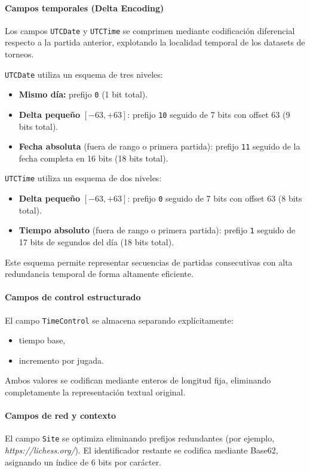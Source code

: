\documentclass[11pt, letterpaper]{article}
\begin{document}
\paragraph{Campos temporales (Delta Encoding)}
Los campos \texttt{UTCDate} y \texttt{UTCTime} se comprimen mediante codificación diferencial respecto a la partida anterior, explotando la localidad temporal de los datasets de torneos.

\texttt{UTCDate} utiliza un esquema de tres niveles:
\begin{itemize}
    \item \textbf{Mismo día:} prefijo \texttt{0} (1 bit total).
    \item \textbf{Delta pequeño} $[-63, +63]$: prefijo \texttt{10} seguido de 7 bits con offset 63 (9 bits total).
    \item \textbf{Fecha absoluta} (fuera de rango o primera partida): prefijo \texttt{11} seguido de la fecha completa en 16 bits (18 bits total).
\end{itemize}

\texttt{UTCTime} utiliza un esquema de dos niveles:
\begin{itemize}
    \item \textbf{Delta pequeño} $[-63, +63]$: prefijo \texttt{0} seguido de 7 bits con offset 63 (8 bits total).
    \item \textbf{Tiempo absoluto} (fuera de rango o primera partida): prefijo \texttt{1} seguido de 17 bits de segundos del día (18 bits total).
\end{itemize}

Este esquema permite representar secuencias de partidas consecutivas con alta redundancia temporal de forma altamente eficiente.

\paragraph{Campos de control estructurado}
El campo \texttt{TimeControl} se almacena separando explícitamente:

\begin{itemize}
    \item tiempo base,
    \item incremento por jugada.
\end{itemize}

Ambos valores se codifican mediante enteros de longitud fija, eliminando completamente la representación textual original.

\paragraph{Campos de red y contexto}
El campo \texttt{Site} se optimiza eliminando prefijos redundantes (por ejemplo, \textit{https://lichess.org/}). El identificador restante se codifica mediante Base62, asignando un índice de 6 bits por carácter.
\end{document}
